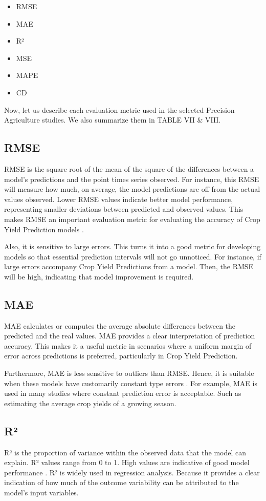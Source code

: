 \documentclass[conference]{IEEEtran}
\begin{document}
\begin{itemize}
\item RMSE
\item MAE
\item R²
\item MSE
\item MAPE
\item CD
\end{itemize}

Now, let us describe each evaluation metric used in the selected Precision Agriculture studies. We also summarize them in TABLE VII \& VIII.

\subsection{RMSE}\label{AA}
RMSE is the square root of the mean of the square of the differences between a model's predictions and the point times series observed. For instance, this RMSE will measure how much, on average, the model predictions are off from the actual values observed. Lower RMSE values indicate better model performance, representing smaller deviations between predicted and observed values. This makes RMSE an important evaluation metric for evaluating the accuracy of Crop Yield Prediction models \cite{b77}. 

Also, it is sensitive to large errors. This turns it into a good metric for developing models so that essential prediction intervals will not go unnoticed. For instance, if large errors accompany Crop Yield Predictions from a model. Then, the RMSE will be high, indicating that model improvement is required.

\subsection{MAE}\label{AA}
MAE calculates or computes the average absolute differences between the predicted and the real values. MAE provides a clear interpretation of prediction accuracy. This makes it a useful metric in scenarios where a uniform margin of error across predictions is preferred, particularly in Crop Yield Prediction.

Furthermore, MAE is less sensitive to outliers than RMSE. Hence, it is suitable when these models have customarily constant type errors \cite{b78}. For example, MAE is used in many studies where constant prediction error is acceptable. Such as estimating the average crop yields of a growing season.

\subsection{R²}\label{AA}
R² is the proportion of variance within the observed data that the model can explain. R² values range from 0 to 1. High values are indicative of good model performance \cite{b79}. R² is widely used in regression analysis. Because it provides a clear indication of how much of the outcome variability can be attributed to the model's input variables.
\end{document}
